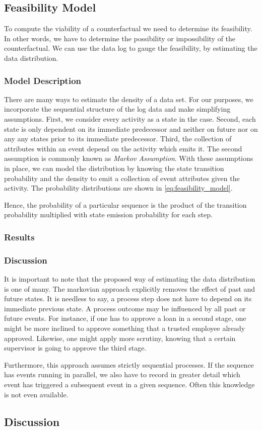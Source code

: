 \documentclass[./../../paper.tex]{subfiles}
\begin{document}
\subsection{Feasibility Model}
To compute the viability of a counterfactual we need to determine its feasibility. In other words, we have to determine the possibility or impossibility of the counterfactual. We can use the data log to gauge the feasibility, by estimating the data distribution.

\subsubsection{Model Description}
There are many ways to estimate the density of a data set. For our purposes, we incorporate the sequential structure of the log data and make simplifying assumptions. First, we consider every activity as a state in the case. Second, each state is only dependent on its immediate predecessor and neither on future nor on any any states prior to its immediate predecessor. Third, the collection of attributes within an event depend on the activity which emits it. The second assumption is commonly known as \emph{Markov Assumption}. With these assumptions in place, we can model the distribution by knowing the state transition probability and the density to emit a collection of event attributes given the activity. The probability distributions are shown in \autoref{eq:feasibility_model}. 


Hence, the probability of a particular sequence is the product of the transition probability multiplied with state emission probability for each step.  

\subsubsection{Results}

\subsubsection{Discussion}
It is important to note that the proposed way of estimating the data distribution is one of many. The markovian approach explicitly removes the effect of past and future states. It is needless to say, a process step does not have to depend on its immediate previous state. A process outcome may be influenced by all past or future events. For instance, if one has to approve a loan in a second stage, one might be more inclined to approve something that a trusted employee already approved. Likewise, one might apply more scrutiny, knowing that a certain supervisor is going to approve the third stage. 

Furthermore, this approach assumes strictly sequential processes. If the sequence has events running in parallel, we also have to record in greater detail which event has triggered a subsequent event in a given sequence. Often this knowledge is not even available.  

\subsection{Discussion}
 
\end{document}
